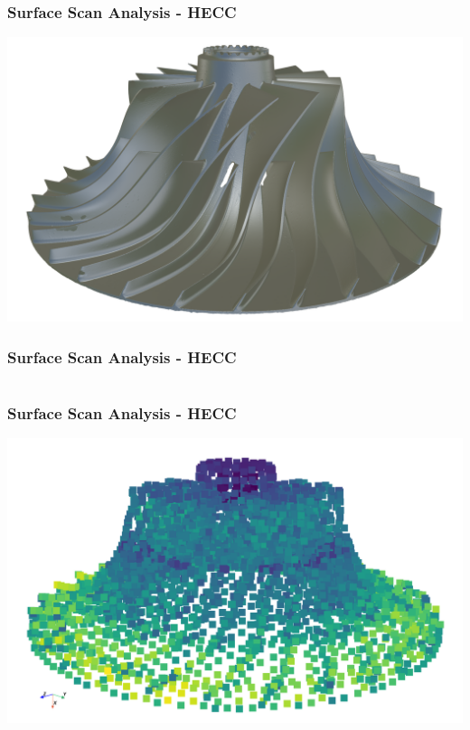 \documentclass[t]{beamer}
\renewcommand{\footnotesize}{\scriptsize}
\begin{document}
\begin{frame}

    \frametitle{Surface Scan Analysis - HECC}

    \begin{center}

        \includegraphics[width=1.0\textwidth]{figures/hecc-rotor-pbr-trans.png}

    \end{center}

\end{frame}

\begin{frame}

    \frametitle{Surface Scan Analysis - HECC}
    \inputminted[fontsize=\footnotesize]{python}{code/hecc-2.py}

\end{frame}

\begin{frame}

    \frametitle{Surface Scan Analysis - HECC}

    \begin{center}
        \includegraphics[width=1.0\textwidth]{figures/hecc-rotor-pfh-pointset.png}
    \end{center}

\end{frame}
\end{document}
